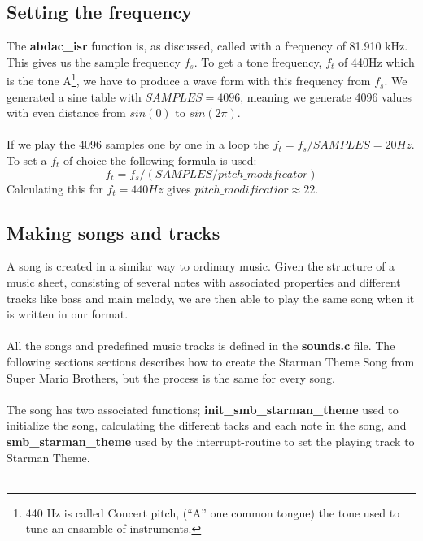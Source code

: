 \subsection{Setting the frequency}
The \textbf{abdac\_isr} function is, as discussed, called with a frequency of 81.910 kHz. This gives us the sample frequency $ f_s $. To
get a tone frequency, $f_t$ of 440Hz which is the tone A\footnote{440 Hz is called Concert pitch, (``A'' one common tongue) the tone used to tune an ensamble of instruments.},
we have to produce a wave form with this frequency from $f_s$. We generated a sine table with $SAMPLES = 4096$, meaning we
generate 4096 values with even distance from $sin(0)$ to $sin(2\pi)$.\\
\\
If we play the 4096 samples one by one in a loop the $f_t = f_s / SAMPLES = 20Hz$. To set a $f_t$ of choice the following formula
is used:
$$f_t = f_s / (SAMPLES / pitch\_modificator) $$
Calculating this for $f_t = 440 Hz$ gives $pitch\_modificatior \approx 22$.

\subsection{Making songs and tracks}
A song is created in a similar way to ordinary music.
Given the structure of a music sheet, consisting of several notes with associated 
properties and different tracks like bass and main melody,
we are then able to play the same song when it is written in our format. \\
\\
All the songs and predefined music tracks is defined in the \textbf{sounds.c} file.
The following sections sections describes how to create the
Starman Theme Song\cite{smb-starman-theme} from Super Mario Brothers, but the process is the same 
for every song.\\
\\
The song has two associated functions; \textbf{init\_smb\_starman\_theme} used to initialize 
the song, calculating the different tacks and each note in the song, 
and \textbf{smb\_starman\_theme} used by the interrupt-routine to set the playing track
to Starman Theme.\\
\\
